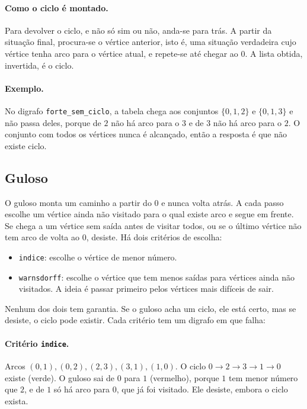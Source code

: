 \documentclass[12pt,a4paper]{article}
\begin{document}
\paragraph{Como o ciclo é montado.} Para devolver o ciclo, e não só sim ou não, anda-se para trás. A partir da situação final, procura-se o vértice anterior, isto é, uma situação verdadeira cujo vértice tenha arco para o vértice atual, e repete-se até chegar ao $0$. A lista obtida, invertida, é o ciclo.

\paragraph{Exemplo.} No digrafo \texttt{forte\_sem\_ciclo}, a tabela chega aos conjuntos $\{0,1,2\}$ e $\{0,1,3\}$ e não passa deles, porque de $2$ não há arco para o $3$ e de $3$ não há arco para o $2$. O conjunto com todos os vértices nunca é alcançado, então a resposta é que não existe ciclo.




\subsection{Guloso}
\label{sec:guloso}

O guloso monta um caminho a partir do $0$ e nunca volta atrás. A cada passo escolhe um vértice ainda não visitado para o qual existe arco e segue em frente. Se chega a um vértice sem saída antes de visitar todos, ou se o último vértice não tem arco de volta ao $0$, desiste. Há dois critérios de escolha:

\begin{itemize}
  \item \texttt{indice}: escolhe o vértice de menor número.
  \item \texttt{warnsdorff}: escolhe o vértice que tem menos saídas para vértices ainda não visitados. A ideia é passar primeiro pelos vértices mais difíceis de sair.
\end{itemize}

Nenhum dos dois tem garantia. Se o guloso acha um ciclo, ele está certo, mas se desiste, o ciclo pode existir. Cada critério tem um digrafo em que falha:

\paragraph{Critério \texttt{indice}.} Arcos $(0,1),(0,2),(2,3),(3,1),(1,0)$. O ciclo $0\to2\to3\to1\to0$ existe (verde). O guloso sai de $0$ para $1$ (vermelho), porque $1$ tem menor número que $2$, e de $1$ só há arco para $0$, que já foi visitado. Ele desiste, embora o ciclo exista.
\end{document}
